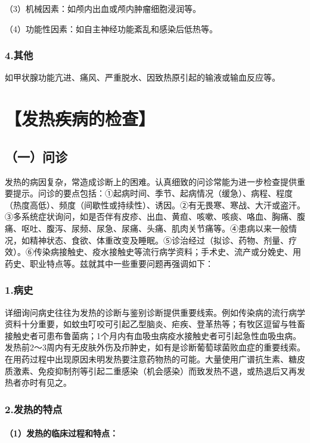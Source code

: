 （3）机械因素：如颅内出血或颅内肿瘤细胞浸润等。

（4）功能性因素：如自主神经功能紊乱和感染后低热等。

\subsubsection{4.其他}

如甲状腺功能亢进、痛风、严重脱水、因致热原引起的输液或输血反应等。

\section{【发热疾病的检查】}

\subsection{（一）问诊}

发热的病因复杂，常造成诊断上的困难。认真细致的问诊常能为进一步检查提供重要提示。问诊的要点包括：①起病时间、季节、起病情况（缓急）、病程、程度（热度高低）、频度（间歇性或持续性）、诱因。②有无畏寒、寒战、大汗或盗汗。③多系统症状询问，如是否伴有皮疹、出血、黄疸、咳嗽、咳痰、咯血、胸痛、腹痛、呕吐、腹泻、尿频、尿急、尿痛、头痛、肌肉关节痛等。④患病以来一般情况，如精神状态、食欲、体重改变及睡眠。⑤诊治经过（拟诊、药物、剂量、疗效）。⑥传染病接触史、疫水接触史等流行病学资料；手术史、流产或分娩史、用药史、职业特点等。兹就其中一些重要问题再强调如下：

\subsubsection{1.病史}

详细询问病史往往为发热的诊断与鉴别诊断提供重要线索。例如传染病的流行病学资料十分重要，如蚊虫叮咬可引起乙型脑炎、疟疾、登革热等；有牧区逗留与牲畜接触史者可患布鲁菌病；1个月内有血吸虫病疫水接触史者可引起急性血吸虫病。发热前2～3周内有无皮肤外伤及疖肿史，如有是诊断葡萄球菌败血症的重要线索。在用药过程中出现原因未明发热要注意药物热的可能。大量使用广谱抗生素、糖皮质激素、免疫抑制剂等引起二重感染（机会感染）而致发热不退，或热退后又再发热者亦时有见之。

\subsubsection{2.发热的特点}

\paragraph{（1）发热的临床过程和特点：}

